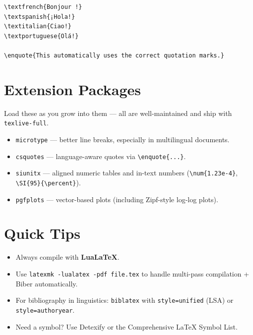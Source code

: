 \documentclass[11pt,a4paper]{article}
\begin{document}
\begin{verbatim}
\textfrench{Bonjour !}
\textspanish{¡Hola!}
\textitalian{Ciao!}
\textportuguese{Olá!}

\enquote{This automatically uses the correct quotation marks.}
\end{verbatim}

\section{Extension Packages}

Load these as you grow into them --- all are well-maintained and ship with \texttt{texlive-full}.

\begin{itemize}[leftmargin=*]
  \item \texttt{microtype} --- better line breaks, especially in multilingual documents.
  \item \texttt{csquotes} --- language-aware quotes via \verb|\enquote{...}|.
  \item \texttt{siunitx} --- aligned numeric tables and in-text numbers (\verb|\num{1.23e-4}|, \verb|\SI{95}{\percent}|).
  \item \texttt{pgfplots} --- vector-based plots (including Zipf-style log-log plots).
\end{itemize}

\section{Quick Tips}

\begin{itemize}[leftmargin=*]
  \item Always compile with \textbf{LuaLaTeX}.
  \item Use \texttt{latexmk -lualatex -pdf file.tex} to handle multi-pass compilation + Biber automatically.
  \item For bibliography in linguistics: \texttt{biblatex} with \texttt{style=unified} (LSA) or \texttt{style=authoryear}.
  \item Need a symbol? Use Detexify or the Comprehensive LaTeX Symbol List.
\end{itemize}
\end{document}
